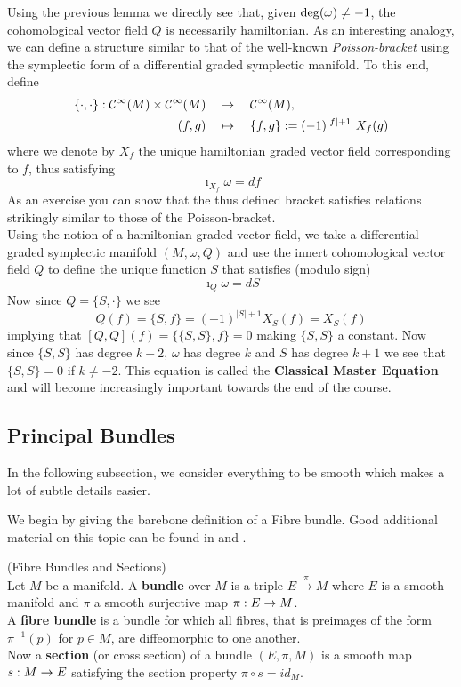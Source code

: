Using the previous lemma we directly see that, given $\operatorname{deg}(\omega) \neq -1$, the cohomological vector field $Q$ is necessarily hamiltonian. As an interesting analogy, we can define a structure similar to that of the well-known \emph{Poisson-bracket} using the symplectic form of a differential graded symplectic manifold. To this end, define
\begin{align}
  \{\cdot, \cdot \} : \mathcal{C}^{\infty}(M) \times \mathcal{C}^{\infty}(M) \quad &\rightarrow \quad \mathcal{C}^{\infty}(M),\\
  (f,g) \quad &\mapsto \quad \{f,g\} := (-1)^{|f|+1} \ X_f(g)
\end{align}
where we denote by $X_f$ the unique hamiltonian graded vector field corresponding to $f$, thus satisfying
$$ \imath_{X_f}\omega = df $$
As an exercise you can show that the thus defined bracket satisfies relations strikingly similar to those of the Poisson-bracket.\\

Using the notion of a hamiltonian graded vector field, we take a differential graded symplectic manifold $(M,\omega, Q)$ and use the innert cohomological vector field $Q$ to define the unique function $S$ that satisfies (modulo sign)
$$ \imath_Q \omega = dS $$
Now since $Q = \{S,\cdot\}$ we see
$$ Q(f) = \{S, f\} = (-1)^{|S|+1} X_S(f) = X_S(f) $$
implying that $[Q,Q](f) = \{\{S,S\},f\} = 0$ making $\{S,S\}$ a constant. Now since $\{S,S\}$ has degree $k+2$, $\omega$ has degree $k$ and $S$ has degree $k+1$ we see that $\{S,S\} = 0$ if $k \neq -2$. This equation is called the \textbf{Classical Master Equation} and will become increasingly important towards the end of the course.

\newpage
\subsection{Principal Bundles}

\begin{rem}
  In the following subsection, we consider everything to be smooth which makes a lot of subtle details easier.
\end{rem}

We begin by giving the barebone definition of a Fibre bundle. Good additional material on this topic can be found in   and .

\begin{definition} (Fibre Bundles and Sections)\\
  Let $M$ be a manifold. A \textbf{bundle} over $M$ is a triple $E\overset{\pi}{\longrightarrow}M$ where $E$ is a smooth manifold and $\pi$ a smooth surjective map $\pi:E\rightarrow M$.\\
  A \textbf{fibre bundle} is a bundle for which all fibres, that is preimages of the form $\pi^{-1}(p)$ for $p\in M$, are diffeomorphic to one another.\\
  Now a \textbf{section} (or cross section) of a bundle $(E,\pi,M)$ is a smooth map $s:M\rightarrow E$ satisfying the section property $\pi \circ s = id_M$.
\end{definition}

